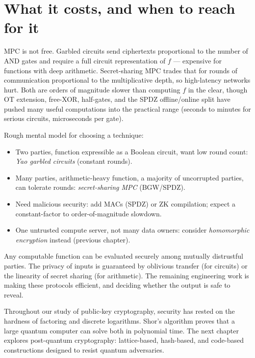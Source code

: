 \section{What it costs, and when to reach for it}
\label{ch34:costs}

MPC is not free. Garbled circuits send ciphertexts proportional to the number of AND gates and require a full circuit representation of $f$ --- expensive for functions with deep arithmetic. Secret-sharing MPC trades that for rounds of communication proportional to the multiplicative depth, so high-latency networks hurt. Both are orders of magnitude slower than computing $f$ in the clear, though OT extension, free-XOR, half-gates, and the SPDZ offline/online split have pushed many useful computations into the practical range (seconds to minutes for serious circuits, microseconds per gate).

\begin{marginnotebox}
Rough mental model for choosing a technique:
\begin{itemize}
  \item Two parties, function expressible as a Boolean circuit, want low round count: \emph{Yao garbled circuits} (constant rounds).
  \item Many parties, arithmetic-heavy function, a majority of uncorrupted parties, can tolerate rounds: \emph{secret-sharing MPC} (BGW/SPDZ).
  \item Need malicious security: add MACs (SPDZ) or ZK compilation; expect a constant-factor to order-of-magnitude slowdown.
  \item One untrusted compute server, not many data owners: consider \emph{homomorphic encryption} instead (previous chapter).
\end{itemize}
\end{marginnotebox}

Any computable function can be evaluated securely among mutually distrustful parties. The privacy of inputs is guaranteed by oblivious transfer (for circuits) or the linearity of secret sharing (for arithmetic). The remaining engineering work is making these protocols efficient, and deciding whether the output is safe to reveal.

Throughout our study of public-key cryptography, security has rested on the hardness of factoring and discrete logarithms. Shor's algorithm proves that a large quantum computer can solve both in polynomial time. The next chapter explores post-quantum cryptography: lattice-based, hash-based, and code-based constructions designed to resist quantum adversaries.

